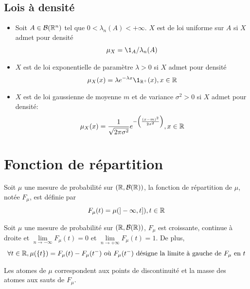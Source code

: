 \documentclass[]{report}
\begin{document}
    \subsection*{Lois à densité}

    \begin{itemize}
        \item Soit $A\in \mathcal{B}(\mathbb{R}^n)$ tel que $0<\lambda_n(A)<+\infty$. $X$ est de loi uniforme sur $A$ si $X$ admet pour densité 
        \[\mu_X=\1_A/\lambda_n(A)\]
        \item $X$ est de loi exponentielle de paramètre $\lambda> 0$ si $X$ admet pour densité
        \[\mu_X(x)=\lambda e^{-\lambda x}\1_{\R^+}(x),x\in \R\]
        \item $X$ est de loi gaussienne de moyenne $m$ et de variance $\sigma^2>0$ si $X$ admet pour densité:
        \[\mu_X(x)=\frac{1}{\sqrt{2\pi\sigma^2}}e^{-\left(\frac{(x-m)^2}{2\sigma^2}\right)},x\in\mathbb{R}\]
    \end{itemize}

    \section{Fonction de répartition}

    \begin{df}{}{}
        Soit $\mu$ une mesure de probabilité sur $(\mathbb{R},\mathcal{B}(\mathbb{R}))$, la fonction de répartition de $\mu$, notée $F_\mu$, est définie par
        \[F_\mu(t)=\mu(]-\infty,t]),t\in \mathbb{R}\]
    \end{df}

    \begin{prop}{}{}
        Soit $\mu$ une mesure de probabilité sur $(\mathbb{R},\mathcal{B}(\mathbb{R}))$, $F_\mu$ est croissante, continue à droite et $\underset{n\to-\infty}{\lim}F_\mu(t)=0$ et $\underset{n\to+\infty}{\lim}F_\mu(t)=1$. De plus,
        \[\forall t\in \mathbb{R},\mu(\{t\})=F_\mu(t)-F_\mu(t^-)\text{ où }F_\mu(t^-)\text{ désigne la limite à gauche de $F_\mu$ en $t$}\]
    \end{prop}

    \begin{re}{}{}
        Les atomes de $\mu$ correspondent aux points de discontinuité et la masse des atomes aux sauts de $F_\mu$.
    \end{re}
\end{document}

